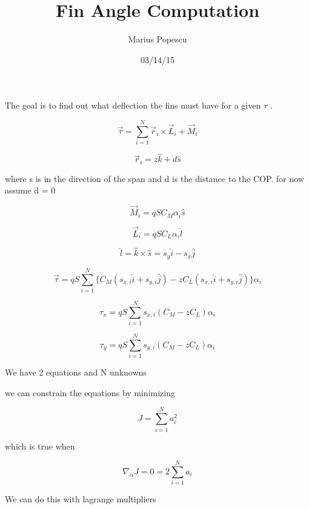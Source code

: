 \documentclass[12pt]{article}
\title{Fin Angle Computation}
\author{Marius Popescu}
\date{03/14/15}
\begin{document}
\maketitle

The goal is to find out what deflection the fins must have for a given $\tau$ .

\begin{equation}
  \vec{\tau} = \sum_{i = 1}^{N} \vec{r}_i \times \vec{L}_i + \vec{M}_i
\end{equation}

\begin{equation}
  \vec{r}_i = z\hat{k} + d \hat{s}
\end{equation}

where s is in the direction of the span and d is the distance to the COP. for now assume d = 0

\begin{equation}
  \vec{M}_i = q S C_M \alpha_i \hat{s} 
\end{equation}

\begin{equation}
  \vec{L}_i = q S C_L \alpha_i \hat{l} 
\end{equation}

\begin{equation}
  \hat{l} = \hat{k} \times \hat{s} = s_y \hat{i} - s_x \hat{j}
\end{equation}

\begin{equation}
  \vec{\tau} = q S\sum_{i = 1}^{N} \{C_M(s_{x,i} \hat{i} + s_{y,i} \hat{j}) - z C_L(s_{x,i} \hat{i} + s_{y,i} \hat{j})\} \alpha_i
\end{equation}

\begin{equation}
  \tau_x = q S\sum_{i = 1}^{N} s_{x,i}(C_M - z C_L) \alpha_i
\end{equation}

\begin{equation}
  \tau_y = q S\sum_{i = 1}^{N} s_{y,i}(C_M - z C_L) \alpha_i
\end{equation}

We have 2 equations and N unknowns

we can constrain the equations by minimizing

\begin{equation}
  J =\sum_{i = 1}^{N} a_i^2 
\end{equation}

which is true when

\begin{equation}
  \nabla_\alpha J = 0 = 2 \sum_{i = 1}^{N} a_i
\end{equation}

We can do this with lagrange multipliers
\end{document}
